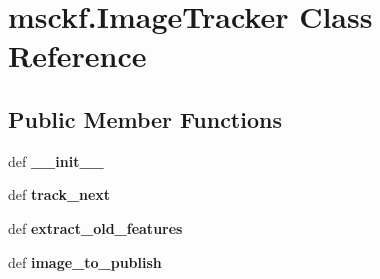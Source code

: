 \hypertarget{classmsckf_1_1_image_tracker}{\section{msckf.\-Image\-Tracker Class Reference}
\label{classmsckf_1_1_image_tracker}
}
\subsection*{Public Member Functions}
\begin{DoxyCompactItemize}
\item 
\hypertarget{classmsckf_1_1_image_tracker_a6cda7073370f94e89f1cf3c5181699be}{def {\bfseries \-\_\-\-\_\-init\-\_\-\-\_\-}}\label{classmsckf_1_1_image_tracker_a6cda7073370f94e89f1cf3c5181699be}

\item 
\hypertarget{classmsckf_1_1_image_tracker_ae642350c572cf0e46ec37d07ba7ee975}{def {\bfseries track\-\_\-next}}\label{classmsckf_1_1_image_tracker_ae642350c572cf0e46ec37d07ba7ee975}

\item 
\hypertarget{classmsckf_1_1_image_tracker_ab4bc5433e45f2c83c18951fe2a3f5aa1}{def {\bfseries extract\-\_\-old\-\_\-features}}\label{classmsckf_1_1_image_tracker_ab4bc5433e45f2c83c18951fe2a3f5aa1}

\item 
\hypertarget{classmsckf_1_1_image_tracker_aaae69c20884145a31bb9aca56ad0e475}{def {\bfseries image\-\_\-to\-\_\-publish}}\label{classmsckf_1_1_image_tracker_aaae69c20884145a31bb9aca56ad0e475}

\end{DoxyCompactItemize}
